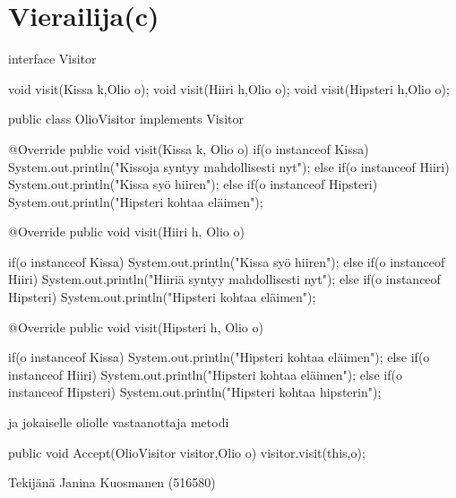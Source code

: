 \section{Vierailija(c)}
\label{Vierailija}
\begin{javacode}
interface Visitor{
	void visit(Kissa k,Olio o);
	void visit(Hiiri h,Olio o);
	void visit(Hipsteri h,Olio o);
	
}

public class OlioVisitor implements Visitor {

	@Override
	public void visit(Kissa k, Olio o) {
			if(o instanceof Kissa) {
				System.out.println("Kissoja syntyy mahdollisesti nyt");
			}else if(o instanceof Hiiri) {
				System.out.println("Kissa syö hiiren");
		}else if(o instanceof Hipsteri) {
			System.out.println("Hipsteri kohtaa eläimen");
	    }
	}

	@Override
	public void visit(Hiiri h, Olio o) {
		if(o instanceof Kissa) {
			System.out.println("Kissa syö hiiren");
		}else if(o instanceof Hiiri) {
			System.out.println("Hiiriä syntyy mahdollisesti nyt");
	}else if(o instanceof Hipsteri) {
		System.out.println("Hipsteri kohtaa eläimen");
    }
		
	}

	@Override
	public void visit(Hipsteri h, Olio o) {
		if(o instanceof Kissa) {
			System.out.println("Hipsteri kohtaa eläimen");
		}else if(o instanceof Hiiri) {
			System.out.println("Hipsteri kohtaa eläimen");
	}else if(o instanceof Hipsteri) {
		System.out.println("Hipsteri kohtaa hipsterin");
    }
		
	}

}


\end{javacode}
ja jokaiselle oliolle vastaanottaja metodi
\begin{javacode}
public void Accept(OlioVisitor visitor,Olio o) {
    	visitor.visit(this,o); 
    	} 
	
\end{javacode}





Tekijänä Janina Kuosmanen (516580)

\label{endofpages}
